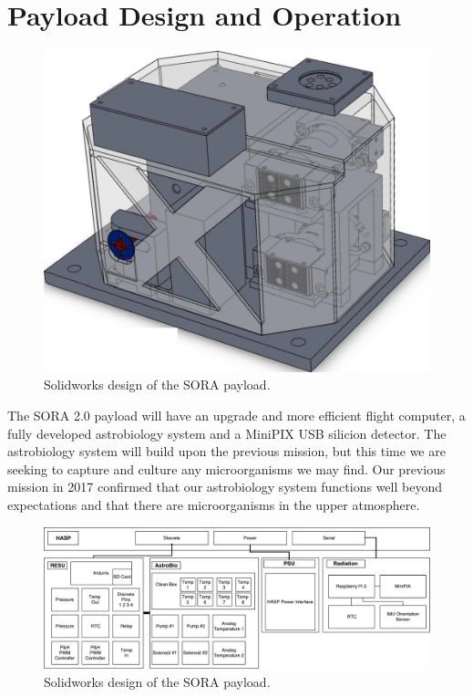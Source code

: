 \section{Payload Design and Operation}
\label{sec:Hardware}

\begin{figure}[!ht]
\begin{center}
\includegraphics[width=.75\textwidth]{./Figures/payload_1.jpg}
\caption{Solidworks design of the SORA payload.}
\label{fig:payload} 
\end{center}
\end{figure}

The SORA 2.0 payload will have an upgrade and more efficient flight computer, a fully developed astrobiology system and a MiniPIX USB silicion detector.  The astrobiology system will build upon the previous mission, but this time we are seeking to capture and culture any microorganisms we may find.  Our previous mission in 2017 confirmed that our astrobiology system functions well beyond expectations and that there are microorganisms in the upper atmosphere.

\begin{figure}[!ht]
\begin{center}
\includegraphics[width=.75\textwidth]{./Figures/RESU_2018.pdf}
\caption{Solidworks design of the SORA payload.}
\label{fig:payload} 
\end{center}
\end{figure}

